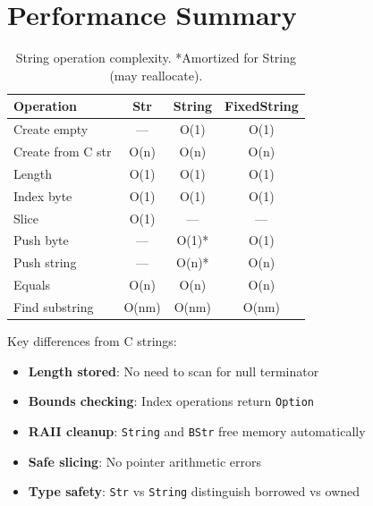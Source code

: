 \section{Performance Summary}
\label{sec:string-performance}

\begin{table}[h]
\centering
\small
\begin{tabular}{lccc}
\textbf{Operation} & \textbf{Str} & \textbf{String} & \textbf{FixedString} \\
\hline
Create empty & --- & O(1) & O(1) \\
Create from C str & O(n) & O(n) & O(n) \\
Length & O(1) & O(1) & O(1) \\
Index byte & O(1) & O(1) & O(1) \\
Slice & O(1) & --- & --- \\
Push byte & --- & O(1)* & O(1) \\
Push string & --- & O(n)* & O(n) \\
Equals & O(n) & O(n) & O(n) \\
Find substring & O(nm) & O(nm) & O(nm) \\
\end{tabular}
\caption{String operation complexity. *Amortized for String (may reallocate).}
\end{table}

\begin{comingfromc}
Key differences from C strings:
\begin{itemize}
    \item \textbf{Length stored}: No need to scan for null terminator
    \item \textbf{Bounds checking}: Index operations return \texttt{Option}
    \item \textbf{RAII cleanup}: \texttt{String} and \texttt{BStr} free memory automatically
    \item \textbf{Safe slicing}: No pointer arithmetic errors
    \item \textbf{Type safety}: \texttt{Str} vs \texttt{String} distinguish borrowed vs owned
\end{itemize}
\end{comingfromc}
